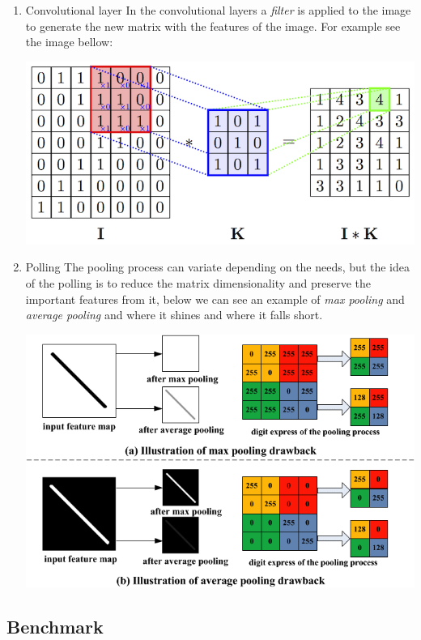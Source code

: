 \documentclass[11pt]{article}
\begin{document}
\begin{enumerate}
\item Convolutional layer
\label{sec:org9877354}
In the convolutional layers a \emph{filter} is applied to the image to generate
the new matrix with the features of the image.
For example see the image bellow:

\begin{center}
\includegraphics[width=.9\linewidth]{./images/convolve.png}
\end{center}


\item Polling
\label{sec:org2e16211}
The pooling process can variate depending on the needs, but the idea of the
polling is to reduce the matrix dimensionality and preserve the important
features from it, below we can see an example of \emph{max pooling} and \emph{average
pooling} and where it shines and where it falls short.

\begin{center}
\includegraphics[width=.9\linewidth]{./images/pooling.png}
\end{center}
\end{enumerate}

\subsection{Benchmark}
\label{sec:org05d8e83}
\end{document}
